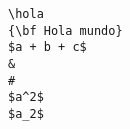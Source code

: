 \documentclass{book}
\begin{document}

\begin{verbatim}
\hola
{\bf Hola mundo}
$a + b + c$
&
#
$a^2$
$a_2$
\end{verbatim}
\end{document}
